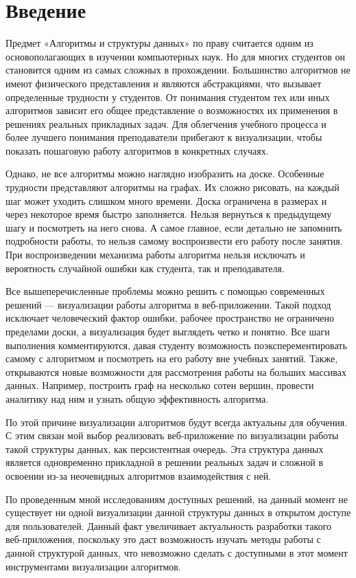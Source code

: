 \documentclass[a4paper,12pt]{extarticle}
\begin{document}
\section{Введение}
Предмет «Алгоритмы и структуры данных» по праву считается одним из основополагающих в изучении компьютерных наук. Но для многих студентов он становится одним из самых сложных в прохождении. Большинство алгоритмов не имеют физического представления и являются абстракциями, что вызывает определенные трудности у студентов. От понимания студентом тех или иных алгоритмов зависит его общее представление о возможностях их применения в решениях реальных прикладных задач. Для облегчения учебного процесса и более лучшего понимания преподаватели прибегают к визуализации, чтобы показать пошаговую работу алгоритмов в конкретных случаях.\par
Однако, не все алгоритмы можно наглядно изобразить на доске. Особенные трудности представляют алгоритмы на графах. Их сложно рисовать, на каждый шаг может уходить слишком много времени. Доска ограничена в размерах и через некоторое время быстро заполняется. Нельзя вернуться к предыдущему шагу и посмотреть на него снова. А самое главное, если детально не запомнить подробности работы, то нельзя самому воспроизвести его работу после занятия. При воспроизведении механизма работы алгоритма нельзя исключать и  вероятность случайной ошибки как студента, так и преподавателя.\par
Все вышеперечисленные проблемы можно решить с помощью современных решений — визуализации работы алгоритма в веб-приложении. Такой подход исключает человеческий фактор ошибки, рабочее пространство не ограничено пределами доски, а визуализация будет выглядеть четко и понятно. Все шаги выполнения комментируются, давая студенту возможность поэксперементировать самому с алгоритмом и посмотреть на его работу вне учебных занятий. Также, открываются новые возможности для рассмотрения работы на больших массивах данных. Например, построить граф на несколько сотен вершин, провести аналитику над ним и узнать общую эффективность алгоритма.\par
По этой причине визуализации алгоритмов будут всегда актуальны для обучения. С этим связан мой выбор реализовать веб-приложение по визуализации работы такой структуры данных, как персистентная очередь. Эта структура данных является одновременно прикладной в решении реальных задач и сложной в освоении из-за неочевидных алгоритмов взаимодействия с ней.\par
По проведенным мной исследованиям доступных решений, на данный момент не существует ни одной визуализации данной структуры данных в открытом доступе для пользователей. Данный факт увеличивает актуальность разработки такого веб-приложения, поскольку это даст возможность изучать методы работы с данной структурой данных, что невозможно сделать с доступными в этот момент инструментами визуализации алгоритмов.\\
\end{document}
